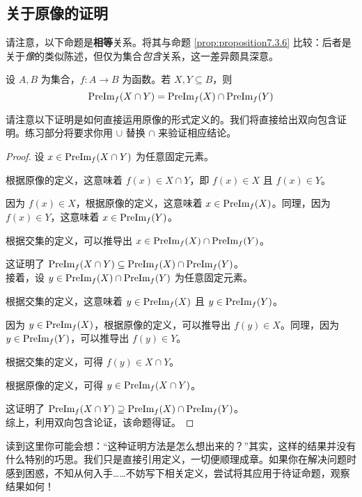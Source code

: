 
\subsection{关于原像的证明}

请注意，以下命题是\textbf{相等}关系。将其与命题 \ref{prop:proposition7.3.6} 比较：后者是关于\emph{像}的类似陈述，但仅为集合\emph{包含}关系，这一差异颇具深意。

\begin{proposition}
    设 $A,B$ 为集合，$f:A \to B$ 为函数。若 $X, Y \subseteq B$，则
    \[\text{PreIm}_f (X \cap Y) = \text{PreIm}_f (X) \cap \text{PreIm}_f (Y)\]
\end{proposition}

请注意以下证明是如何直接运用原像的形式定义的。我们将直接给出双向包含证明。练习部分将要求你用 $\cup$ 替换 $\cap$ 来验证相应结论。

\begin{proof}
    设 $x \in \text{PreIm}_f (X \cap Y)$ 为任意固定元素。

    根据原像的定义，这意味着 $f(x) \in X \cap Y$，即 $f(x) \in X$ 且 $f(x) \in Y$。

    因为 $f(x) \in X$，根据原像的定义，这意味着 $x \in \text{PreIm}_f (X)$。同理，因为 $f(x) \in Y$，这意味着 $x \in \text{PreIm}_f (Y)$。

    根据交集的定义，可以推导出 $x \in \text{PreIm}_f(X) \cap \text{PreIm}_f(Y)$。

    这证明了 $\text{PreIm}_f(X \cap Y) \subseteq \text{PreIm}_f(X) \cap \text{PreIm}_f(Y)$。\\

    接着，设 $y \in \text{PreIm}_f(X) \cap \text{PreIm}_f(Y)$ 为任意固定元素。

    根据交集的定义，这意味着 $y \in \text{PreIm}_f (X)$ 且 $y \in \text{PreIm}_f (Y)$。

    因为 $y \in \text{PreIm}_f (X)$，根据原像的定义，可以推导出 $f(y) \in X$。同理，因为 $y \in \text{PreIm}_f (Y)$，可以推导出 $f(y) \in Y$。

    根据交集的定义，可得 $f(y) \in X \cap Y$。

    根据原像的定义，可得 $y \in \text{PreIm}_f(X \cap Y)$。

    这证明了 $ \text{PreIm}_f(X \cap Y) \supseteq \text{PreIm}_f(X) \cap \text{PreIm}_f(Y)$。 \\

    综上，利用双向包含论证，该命题得证。
\end{proof}

读到这里你可能会想：``这种证明方法是怎么想出来的？''其实，这样的结果并没有什么特别的巧思。我们只是直接引用定义，一切便顺理成章。如果你在解决问题时感到困惑，不知从何入手……不妨写下相关定义，尝试将其应用于待证命题，观察结果如何！

